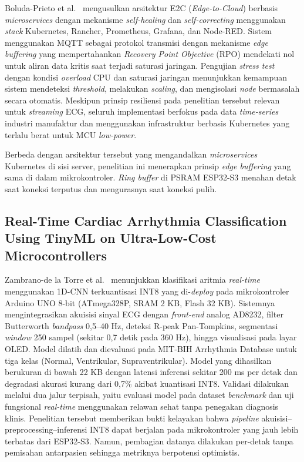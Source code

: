Boluda-Prieto et al.~\cite{resilient_edge_cloud} mengusulkan arsitektur E2C (\textit{Edge-to-Cloud}) berbasis \textit{microservices} dengan mekanisme \textit{self-healing} dan \textit{self-correcting} menggunakan \textit{stack} Kubernetes, Rancher, Prometheus, Grafana, dan Node-RED. Sistem menggunakan MQTT sebagai protokol transmisi dengan mekanisme \textit{edge buffering} yang mempertahankan \textit{Recovery Point Objective} (RPO) mendekati nol untuk aliran data kritis saat terjadi saturasi jaringan. Pengujian \textit{stress test} dengan kondisi \textit{overload} CPU dan saturasi jaringan menunjukkan kemampuan sistem mendeteksi \textit{threshold}, melakukan \textit{scaling}, dan mengisolasi \textit{node} bermasalah secara otomatis. Meskipun prinsip resiliensi pada penelitian tersebut relevan untuk \textit{streaming} ECG, seluruh implementasi berfokus pada data \textit{time-series} industri manufaktur dan menggunakan infrastruktur berbasis Kubernetes yang terlalu berat untuk MCU \textit{low-power}.

Berbeda dengan arsitektur tersebut yang mengandalkan \textit{microservices} Kubernetes di sisi server, penelitian ini menerapkan prinsip \textit{edge buffering} yang sama di dalam mikrokontroler. \textit{Ring buffer} di PSRAM ESP32-S3 menahan detak saat koneksi terputus dan mengurasnya saat koneksi pulih.

\subsection{Real-Time Cardiac Arrhythmia Classification Using TinyML on
Ultra-Low-Cost Microcontrollers}

Zambrano-de la Torre et al.~\cite{zambrano_2026} menunjukkan klasifikasi aritmia \emph{real-time} menggunakan
1D-CNN terkuantisasi INT8 yang di-\emph{deploy} pada mikrokontroler Arduino UNO 8-bit
(ATmega328P, SRAM 2 KB, Flash 32 KB). Sistemnya mengintegrasikan akuisisi sinyal ECG
dengan \emph{front-end} analog AD8232, filter Butterworth \emph{bandpass} 0,5--40 Hz,
deteksi R-peak Pan-Tompkins, segmentasi \emph{window} 250 sampel (sekitar 0,7 detik
pada 360 Hz), hingga visualisasi pada layar OLED. Model dilatih dan dievaluasi pada
MIT-BIH Arrhythmia Database untuk tiga kelas (Normal, Ventrikular, Supraventrikular).
Model yang dihasilkan berukuran di bawah 22 KB dengan latensi inferensi sekitar 200 ms
per detak dan degradasi akurasi kurang dari 0,7\% akibat kuantisasi INT8. Validasi
dilakukan melalui dua jalur terpisah, yaitu evaluasi model pada dataset \emph{benchmark}
dan uji fungsional \emph{real-time} menggunakan relawan sehat tanpa penegakan diagnosis
klinis. Penelitian tersebut memberikan bukti kelayakan bahwa \textit{pipeline}
akuisisi--preprocessing--inferensi INT8 dapat berjalan pada mikrokontroler yang
jauh lebih terbatas dari ESP32-S3. Namun, pembagian datanya dilakukan per-detak tanpa
pemisahan antarpasien sehingga metriknya berpotensi optimistis.

